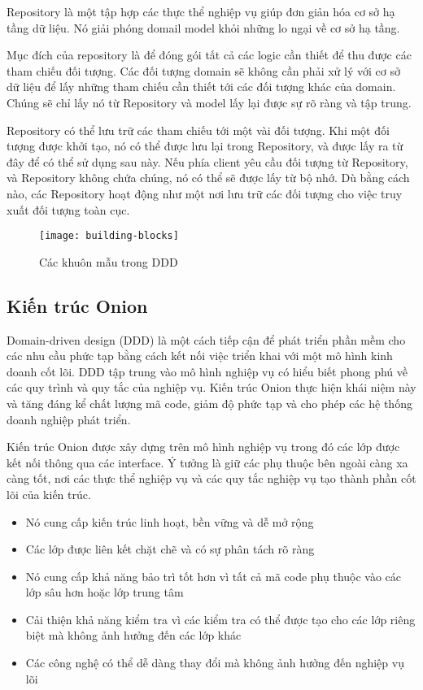 Repository là một tập hợp các thực thể nghiệp vụ giúp đơn giản hóa cơ sở hạ tầng dữ liệu. Nó giải phóng domail model khỏi những lo ngại về cơ sở hạ tầng.

Mục đích của repository là để đóng gói tất cả các logic cần thiết để thu được các tham chiếu đối tượng. Các đối tượng domain sẽ không cần phải xử lý với cơ sở dữ liệu để lấy những tham chiếu cần thiết tới các đối tượng khác của domain. Chúng sẽ chỉ lấy nó từ Repository và model lấy lại được sự rõ ràng và tập trung.

Repository có thể lưu trữ các tham chiếu tới một vài đối tượng. Khi một đối tượng được khởi tạo, nó có thể được lưu lại trong Repository, và được lấy ra từ đây để có thể sử dụng sau này. Nếu phía client yêu cầu đối tượng từ Repository, và Repository không chứa chúng, nó có thể sẽ được lấy từ bộ nhớ. Dù bằng cách nào, các Repository hoạt động như một nơi lưu trữ các đối tượng cho việc truy xuất đối tượng toàn cục.

\begin{figure}[H]
	\centering
	\texttt{[image: building-blocks]}
	\caption{Các khuôn mẫu trong DDD}
\end{figure}

\subsection{Kiến trúc Onion}

Domain-driven design (DDD) là một cách tiếp cận để phát triển phần mềm cho các nhu cầu phức tạp bằng cách kết nối việc triển khai với một mô hình kinh doanh cốt lõi. DDD tập trung vào mô hình nghiệp vụ có hiểu biết phong phú về các quy trình và quy tắc của nghiệp vụ. Kiến trúc Onion thực hiện khái niệm này và tăng đáng kể chất lượng mã code, giảm độ phức tạp và cho phép các hệ thống doanh nghiệp phát triển.

Kiến trúc Onion được xây dựng trên mô hình nghiệp vụ trong đó các lớp được kết nối thông qua các interface. Ý tưởng là giữ các phụ thuộc bên ngoài càng xa càng tốt, nơi các thực thể nghiệp vụ và các quy tắc nghiệp vụ tạo thành phần cốt lõi của kiến trúc.

\begin{itemize}
	\item Nó cung cấp kiến trúc linh hoạt, bền vững và dễ mở rộng
	\item Các lớp được liên kết chặt chẽ và có sự phân tách rõ ràng
	\item Nó cung cấp khả năng bảo trì tốt hơn vì tất cả mã code phụ thuộc vào các lớp sâu hơn hoặc lớp trung tâm
	\item Cải thiện khả năng kiểm tra vì các kiểm tra có thể được tạo cho các lớp riêng biệt mà không ảnh hưởng đến các lớp khác
	\item Các công nghệ có thể dễ dàng thay đổi mà không ảnh hưởng đến nghiệp vụ lõi
\end{itemize}

